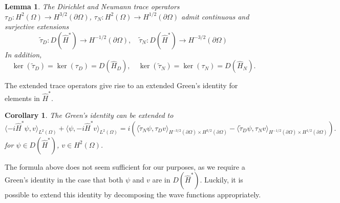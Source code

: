 \documentclass{article}
\numberwithin{equation}{section}
\newtheorem{lemma}{Lemma}[section]
\newtheorem{corollary}{Corollary}[section]
\begin{document}
\begin{lemma}\label{Trace Extensions} \cite[Theorem 8.3.9]{BHS2020}
    The Dirichlet and Neumann trace operators $\tau_D:H^2(\Omega)\to H^{3/2}(\partial \Omega)$, $\tau_N:H^2(\Omega)\to H^{1/2}(\partial \Omega)$ admit continuous and surjective extensions
    \begin{equation}
        \tilde{\tau}_D:D(\hat{H}^*)\to H^{{-1/2}}(\partial \Omega), \quad \tilde{\tau}_N:D(\hat{H}^*)\to H^{{-3/2}}(\partial \Omega)
    \end{equation}
    In addition,
    \begin{equation}
        \ker (\tilde{\tau}_D)=\ker(\tau_D)=D(\hat{H}_D), \quad \ker (\tilde{\tau}_N)=\ker(\tau_N)=D(\hat{H}_N).
    \end{equation}
\end{lemma}
The extended trace operators give rise to an extended Green's identity for elements in $\hat{H}^*$.
\begin{corollary}\cite[Corollary 8.3.11]{BHS2020}
    The Green's identity can be extended to 
    \begin{equation}\label{Green's Identity Star}
        \langle -i\hat{H}^*\psi,v\rangle_{L^2(\Omega)}+ \langle \psi,-i\hat{H}^*v \rangle_{L^2(\Omega)}=i\left( \langle \tilde{\tau}_N \psi, \tau_D v\rangle_{H^{-3/2}(\partial \Omega)\times H^{3/2}(\partial \Omega)} -\langle  \tilde{\tau}_D \psi, \tau_N v\rangle_{H^{-1/2}(\partial \Omega)\times H^{1/2}(\partial \Omega)}\right).
    \end{equation}
    for $\psi \in D(\hat{H}^*)$, $v \in H^2(\Omega)$.
\end{corollary}
The formula above does not seem sufficient for our purposes, as we require a Green's identity in the case that both $\psi$ and $v$ are in $D(\hat{H}^*)$. Luckily, it is possible to extend this identity by decomposing the wave functions appropriately. 
\end{document}
